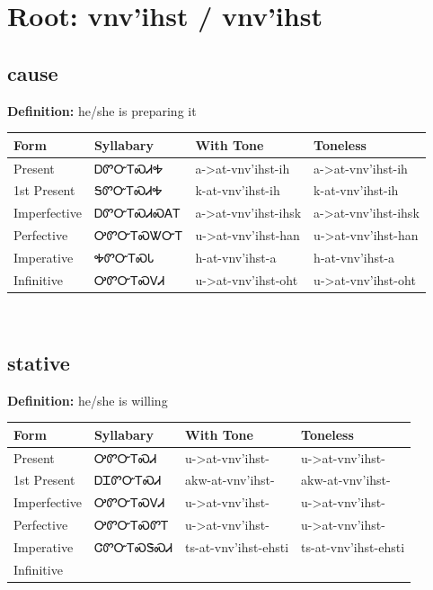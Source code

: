 \documentclass{article}%
\begin{document}
%
\normalsize%
\section*{Root: vnv'ihst / vnv'ihst}%
\subsection*{cause}%
\textbf{Definition: }%
he/she is preparing it%
\\[0.5em]%
\begin{tabular}{|l|l|l|l|}%
\hline%
\textbf{Form}&\textbf{Syllabary}&\textbf{With Tone}&\textbf{Toneless}\\%
\hline%
Present&ᎠᏛᏅᎢᏍᏗᎭ&a{-}>at{-}vnv'ihst{-}ih&a{-}>at{-}vnv'ihst{-}ih\\%
1st Present&ᎦᏛᏅᎢᏍᏗᎭ&k{-}at{-}vnv'ihst{-}ih&k{-}at{-}vnv'ihst{-}ih\\%
Imperfective&ᎠᏛᏅᎢᏍᏗᏍᎪᎢ&a{-}>at{-}vnv'ihst{-}ihsk&a{-}>at{-}vnv'ihst{-}ihsk\\%
Perfective&ᎤᏛᏅᎢᏍᏔᏅᎢ&u{-}>at{-}vnv'ihst{-}han&u{-}>at{-}vnv'ihst{-}han\\%
Imperative&ᎭᏛᏅᎢᏍᏓ&h{-}at{-}vnv'ihst{-}a&h{-}at{-}vnv'ihst{-}a\\%
Infinitive&ᎤᏛᏅᎢᏍᏙᏗ&u{-}>at{-}vnv'ihst{-}oht&u{-}>at{-}vnv'ihst{-}oht\\%
\hline%
\end{tabular}%
\\[1em]%
\subsection*{stative}%
\textbf{Definition: }%
he/she is willing%
\\[0.5em]%
\begin{tabular}{|l|l|l|l|}%
\hline%
\textbf{Form}&\textbf{Syllabary}&\textbf{With Tone}&\textbf{Toneless}\\%
\hline%
Present&ᎤᏛᏅᎢᏍᏗ&u{-}>at{-}vnv'ihst{-}&u{-}>at{-}vnv'ihst{-}\\%
1st Present&ᎠᏆᏛᏅᎢᏍᏗ&akw{-}at{-}vnv'ihst{-}&akw{-}at{-}vnv'ihst{-}\\%
Imperfective&ᎤᏛᏅᎢᏍᏙᏗ&u{-}>at{-}vnv'ihst{-}&u{-}>at{-}vnv'ihst{-}\\%
Perfective&ᎤᏛᏅᎢᏍᏛᎢ&u{-}>at{-}vnv'ihst{-}&u{-}>at{-}vnv'ihst{-}\\%
Imperative&ᏣᏛᏅᎢᏍᏕᏍᏗ&ts{-}at{-}vnv'ihst{-}ehsti&ts{-}at{-}vnv'ihst{-}ehsti\\%
Infinitive&&&\\%
\hline%
\end{tabular}%
\\[1em]%
\end{document}
